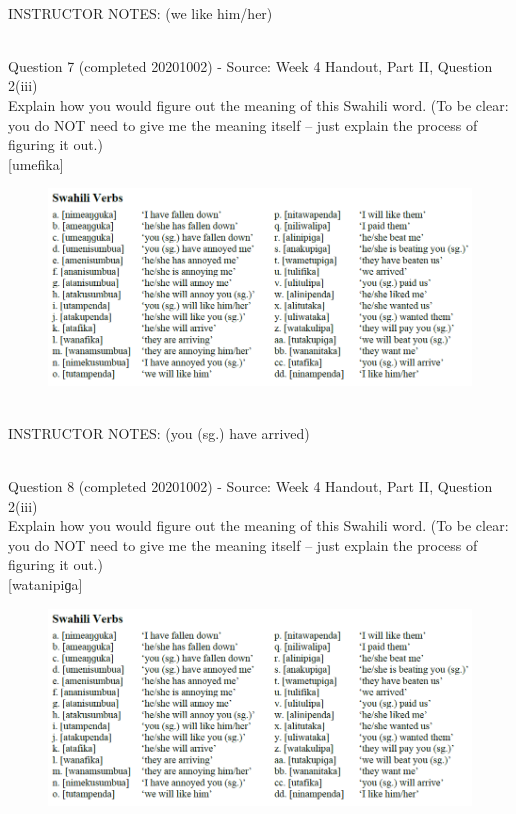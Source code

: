 \documentclass[12pt]{article}
\begin{document}
~\\
INSTRUCTOR NOTES: (we like him/her)


~\\

{\large Question 7} (completed 20201002) - Source: Week 4 Handout, Part II, Question 2(iii)\\

Explain how you would figure out the meaning of this Swahili word. (To be clear: you do NOT need to give me the meaning itself -- just explain the process of figuring it out.)\\

{[umefika]}

\begin{figure}[H]
\includegraphics{../images/swahiliverbs.png}
\end{figure}

~\\
INSTRUCTOR NOTES: (you (sg.) have arrived)


~\\

{\large Question 8} (completed 20201002) - Source: Week 4 Handout, Part II, Question 2(iii)\\

Explain how you would figure out the meaning of this Swahili word. (To be clear: you do NOT need to give me the meaning itself -- just explain the process of figuring it out.)\\

{[watanipiɡa]}

\begin{figure}[H]
\includegraphics{../images/swahiliverbs.png}
\end{figure}
\end{document}
